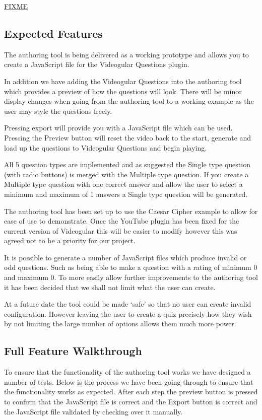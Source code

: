\documentclass[12pt,a4paper]{article}
\begin{document}
\url{FIXME}

\subsection{Expected Features}

The authoring tool is being delivered as a working prototype and allows you to create a JavaScript file for the Videogular Questions plugin.

In addition we have adding the Videogular Questions into the authoring tool which provides a preview of how the questions will look. There will be minor display changes when going from the authoring tool to a working example as the user may style the questions freely.

Pressing export will provide you with a JavaScript file which can be used. Pressing the Preview button will reset the video back to the start, generate and load up the questions to Videogular Questions and begin playing.

All 5 question types are implemented and as suggested the Single type question (with radio buttons) is merged with the Multiple type question. If you create a Multiple type question with one correct answer and allow the user to select a minimum and maximum of 1 answers a Single type question will be generated.

The authoring tool has been set up to use the Caesar Cipher example to allow for ease of use to demonstrate. Once the YouTube plugin has been fixed for the current version of Videogular this will be easier to modify however this was agreed not to be a priority for our project.

It is possible to generate a number of JavaScript files which produce invalid or odd questions. Such as being able to make a question with a rating of minimum 0 and maximum 0. To more easily allow further improvements to the authoring tool it has been decided that we shall not limit what the user can create.

At a future date the tool could be made `safe' so that no user can create invalid configuration. However leaving the user to create a quiz precisely how they wish by not limiting the large number of options allows them much more power.

\subsection{Full Feature Walkthrough}

To ensure that the functionality of the authoring tool works we have designed a number of tests. Below is the process we have been going through to ensure that the functionality works as expected. After each step the preview button is pressed to confirm that the JavaScript file is correct and the Export button is correct and the JavaScript file validated by checking over it manually.
\end{document}
